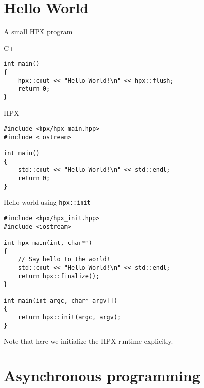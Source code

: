 \documentclass[12pt,t]{beamer}
\begin{document}
\section{Hello World}

\begin{frame}[fragile]{A small HPX program}

\begin{block}{C++}
\begin{lstlisting}
int main()
{
    hpx::cout << "Hello World!\n" << hpx::flush;
    return 0;
}
\end{lstlisting}
\end{block}

\begin{block}{HPX}
\begin{lstlisting}
#include <hpx/hpx_main.hpp>
#include <iostream>

int main()
{
    std::cout << "Hello World!\n" << std::endl;
    return 0;
}
\end{lstlisting}
\end{block}

\end{frame}


\begin{frame}[fragile]{Hello world using \lstinline{hpx::init}}

\begin{lstlisting}
#include <hpx/hpx_init.hpp>
#include <iostream>

int hpx_main(int, char**)
{
    // Say hello to the world!
    std::cout << "Hello World!\n" << std::endl;
    return hpx::finalize();
}

int main(int argc, char* argv[])
{
    return hpx::init(argc, argv);
}
\end{lstlisting}
\begin{center}
Note that here we  initialize the HPX runtime explicitly.
\end{center}
\end{frame}

\section{Asynchronous programming}
\end{document}
